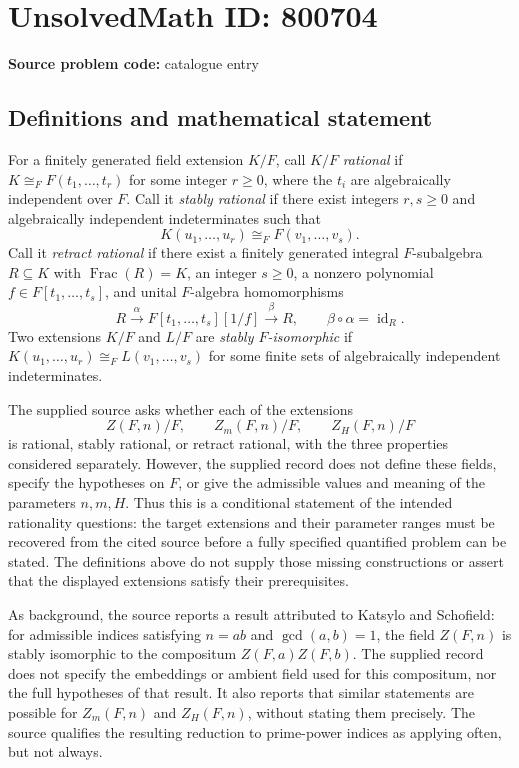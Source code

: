 \documentclass[11pt]{article}
\begin{document}
\section*{UnsolvedMath ID: 800704}
\textbf{Source problem code:} catalogue entry
\subsection{Definitions and mathematical statement}
For a finitely generated field extension \(K/F\), call \(K/F\) \emph{rational} if \(K\cong_F F(t_1,\ldots,t_r)\) for some integer \(r\geq 0\), where the \(t_i\) are algebraically independent over \(F\). Call it \emph{stably rational} if there exist integers \(r,s\geq 0\) and algebraically independent indeterminates such that
\[
K(u_1,\ldots,u_r)\cong_F F(v_1,\ldots,v_s).
\]
Call it \emph{retract rational} if there exist a finitely generated integral \(F\)-subalgebra \(R\subseteq K\) with \(\operatorname{Frac}(R)=K\), an integer \(s\geq 0\), a nonzero polynomial \(f\in F[t_1,\ldots,t_s]\), and unital \(F\)-algebra homomorphisms
\[
R\xrightarrow{\alpha}F[t_1,\ldots,t_s][1/f]\xrightarrow{\beta}R,
\qquad \beta\circ\alpha=\operatorname{id}_R.
\]
Two extensions \(K/F\) and \(L/F\) are \emph{stably \(F\)-isomorphic} if \(K(u_1,\ldots,u_r)\cong_F L(v_1,\ldots,v_s)\) for some finite sets of algebraically independent indeterminates.

The supplied source asks whether each of the extensions
\[
Z(F,n)/F,\qquad Z_m(F,n)/F,\qquad Z_H(F,n)/F
\]
is rational, stably rational, or retract rational, with the three properties considered separately. However, the supplied record does not define these fields, specify the hypotheses on \(F\), or give the admissible values and meaning of the parameters \(n,m,H\). Thus this is a conditional statement of the intended rationality questions: the target extensions and their parameter ranges must be recovered from the cited source before a fully specified quantified problem can be stated. The definitions above do not supply those missing constructions or assert that the displayed extensions satisfy their prerequisites.

As background, the source reports a result attributed to Katsylo and Schofield: for admissible indices satisfying \(n=ab\) and \(\gcd(a,b)=1\), the field \(Z(F,n)\) is stably isomorphic to the compositum \(Z(F,a)Z(F,b)\). The supplied record does not specify the embeddings or ambient field used for this compositum, nor the full hypotheses of that result. It also reports that similar statements are possible for \(Z_m(F,n)\) and \(Z_H(F,n)\), without stating them precisely. The source qualifies the resulting reduction to prime-power indices as applying often, but not always.
\end{document}
